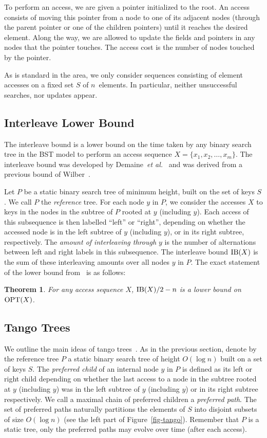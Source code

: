 \documentclass[letterpaper,11pt]{article}
\newtheorem{thm}{Theorem}
\begin{document}
To perform an access, we are given a pointer initialized to the root. An access
consists of moving this pointer from a node to one of its adjacent nodes
(through the parent pointer or one of the children pointers) until it reaches
the desired element. Along the way, we are allowed to update the fields and
pointers in any nodes that the pointer touches. The access cost is the number
of nodes touched by the pointer.  

As is standard in the area, we only consider sequences consisting of element
accesses on a fixed set $S$ of $n$~elements. In particular, neither
unsuccessful searches, nor updates appear.

\subsection{Interleave Lower Bound}
The interleave bound is a lower bound on the time taken by any binary
search tree in the BST model to perform an access sequence
$X=\{x_1,x_2,\ldots,x_m\}$. The interleave bound was developed by
Demaine~\emph{et al.}~\cite{tango} and was derived from a previous bound of
Wilber~\cite{wilber}.

Let $P$ be a static binary search tree of minimum height, built on the set
of keys $S$. We call $P$ the \emph{reference} tree. For each node $y$ in
$P$, we consider the accesses $X$ to keys in the nodes in the subtree of
$P$ rooted at $y$ (including $y$). Each access of this subsequence is then
labelled ``left'' or ``right'', depending on whether the accessed node is
in the left subtree of $y$ (including $y$), or in its right subtree,
respectively. The \emph{amount of interleaving through $y$} is the number
of alternations between left and right labels in this subsequence. The
interleave bound ${\rm IB}(X)$ is the sum of these interleaving amounts
over all nodes $y$ in $P$.
The exact statement of the lower bound from~\cite{tango} is as follows:
\begin{thm}
\label{ib}
For any access sequence $X$, 
${\rm IB}(X)/2- n$ is a lower bound on ${\rm OPT}(X)$.
\end{thm}

\subsection{Tango Trees}
We outline the main ideas of tango trees~\cite{tango}.
As in the previous section, denote by the reference tree $P$ a static
binary search tree of height $O(\log n)$ built on a set of keys $S$. The
\emph{preferred child} of an internal node $y$ in $P$ is defined as its
left or right child depending on whether the last access to a node in the
subtree rooted at $y$ (including $y$) was in the left subtree of $y$
(including $y$) or in its right subtree respectively. We call a maximal
chain of preferred children a \emph{preferred path}. The set of preferred
paths naturally partitions the elements of $S$ into disjoint subsets of
size $O(\log n)$ (see the left part of Figure~\ref{fig-tango}). Remember
that $P$ is a static tree, only the preferred paths may evolve over time
(after each access).
\end{document}
